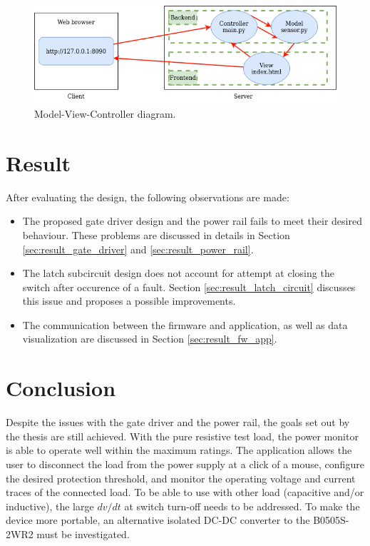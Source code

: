 \documentclass[12pt,letterpaper]{report}
\begin{document}
\begin{figure}[!h]
  \centerline{\includegraphics[width=\linewidth]{media/mvc_modified.drawio.png}}
  \caption{Model-View-Controller diagram.}
  \label{fig:application_flowchart}
\end{figure}

\pagebreak


\chapter{Result}
After evaluating the design, the following observations are made:
\begin{itemize}
  \item The proposed gate driver design and the power rail fails to meet their desired behaviour. These problems are discussed in details in Section \ref{sec:result_gate_driver} and \ref{sec:result_power_rail}.
  \item The latch subcircuit design does not account for attempt at closing the switch after occurence of a fault. Section \ref{sec:result_latch_circuit} discusses this issue and proposes a possible improvements.
  \item The communication between the firmware and application, as well as data visualization are discussed in Section \ref{sec:result_fw_app}.
\end{itemize}

\pagebreak


\chapter{Conclusion}
\justify
Despite the issues with the gate driver and the power rail, the goals set out by the thesis are still achieved. With the pure resistive test load, the power monitor is able to operate well within the maximum ratings. The application allows the user to disconnect the load from the power supply at a click of a mouse, configure the desired protection threshold, and monitor the operating voltage and current traces of the connected load. To be able to use with other load (capacitive and/or inductive), the large $dv/dt$ at switch turn-off needs to be addressed. To make the device more portable, an alternative isolated DC-DC converter to the B0505S-2WR2 must be investigated.


\printbibliography
\end{document}
